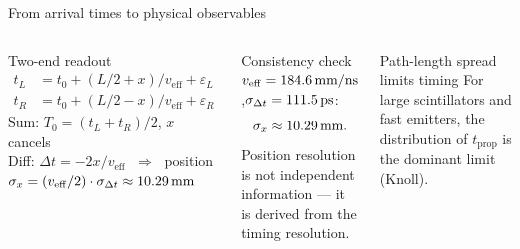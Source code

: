 \documentclass[aspectratio=169,9pt]{beamer}
\newcommand{\veff}{v_{\mathrm{eff}}}
\begin{document}
\begin{frame}{From arrival times to physical observables}
  \begin{columns}[T]
      \begin{block}{Two-end readout}
        \begin{align*}
          t_L &= t_0 + (L/2+x)/\veff + \varepsilon_L\\
          t_R &= t_0 + (L/2-x)/\veff + \varepsilon_R
        \end{align*}
        Sum: $T_0=(t_L+t_R)/2$, $x$ cancels\\
        Diff: $\Delta t = -2x/\veff$ $\;\Rightarrow\;$ position\\[4pt]
        $\sigma_x = (\veff/2)\cdot\sigma_{\Delta t} \approx \Napsigmaxendmm$
      \end{block}

      \begin{block}{Consistency check}
        {\small $\veff=\Napveffendmmns$,\;$\sigma_{\Delta t}=111.5\,\text{ps}$:
        \[\sigma_x\approx10.29\,\text{mm}.\]
        Position resolution is not independent information —
        it is derived from the timing resolution.}
      \end{block}
      \begin{alertblock}{Path-length spread limits timing}
        {\small For large scintillators and fast emitters, the distribution
        of $t_{\mathrm{prop}}$ is the dominant limit (Knoll).}
      \end{alertblock}
  \end{columns}
\end{frame}
\end{document}
